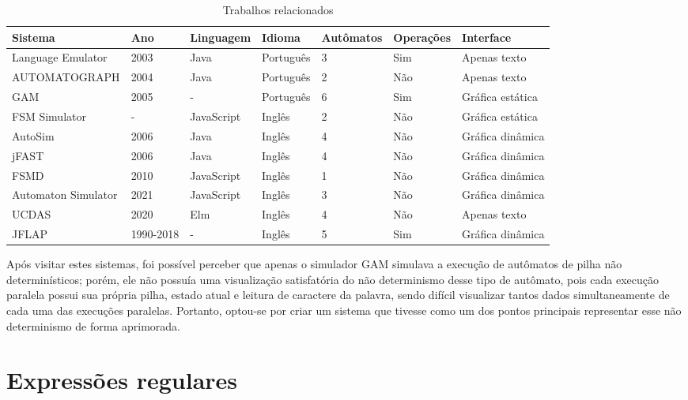 \renewcommand{\arraystretch}{1.5}
\begin{table}[h]
    \centering
    \begin{tabularx}{\textwidth}{|X|X|X|X|X|X|X|}
        \hline
        \rowcolor{lightgray}
         Sistema & Ano & Linguagem & Idioma & Autômatos & Operações & Interface \\\hline
         Language Emulator & 2003 & Java & Português & 3 & Sim & Apenas texto \\\hline
         AUTOMATOGRAPH & 2004 & Java & Português & 2 & Não & Apenas texto \\\hline
         GAM & 2005 & - & Português & 6 & Sim & Gráfica estática \\\hline
         FSM Simulator & - & JavaScript & Inglês & 2 & Não & Gráfica estática \\\hline
         AutoSim & 2006 & Java & Inglês & 4 & Não & Gráfica dinâmica \\\hline
         jFAST & 2006 & Java & Inglês & 4 & Não & Gráfica dinâmica \\\hline
         FSMD & 2010 & JavaScript & Inglês & 1 & Não & Gráfica dinâmica \\\hline
         Automaton Simulator & 2021 & JavaScript & Inglês & 3 & Não & Gráfica dinâmica \\\hline
         UCDAS & 2020 & Elm & Inglês & 4 & Não & Apenas texto \\\hline
         JFLAP & 1990-2018 & - & Inglês & 5 & Sim & Gráfica dinâmica \\\hline
    \end{tabularx}
    \caption{Trabalhos relacionados}
    \label{tab:comparacao_de_sistemas}
\end{table}

Após visitar estes sistemas, foi possível perceber que apenas o simulador GAM simulava a execução de autômatos de pilha não determinísticos; porém, ele não possuía uma visualização satisfatória do não determinismo desse tipo de autômato, pois cada execução paralela possui sua própria pilha, estado atual e leitura de caractere da palavra, sendo difícil visualizar tantos dados simultaneamente de cada uma das execuções paralelas. Portanto, optou-se por criar um sistema que tivesse como um dos pontos principais representar esse não determinismo de forma aprimorada.


\section{Expressões regulares}

